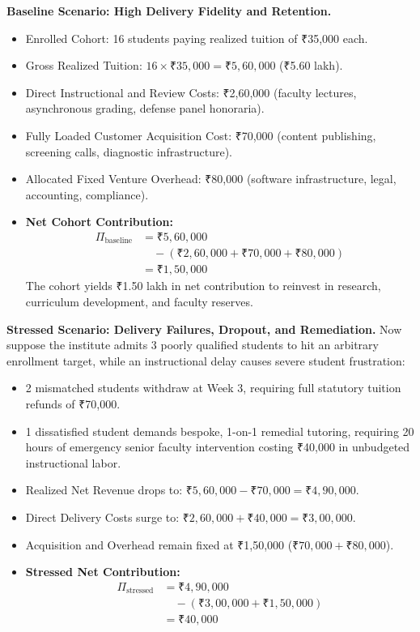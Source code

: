 \textbf{Baseline Scenario: High Delivery Fidelity and Retention.}
\begin{itemize}[leftmargin=*]
\item Enrolled Cohort: 16 students paying realized tuition of ₹35,000 each.
\item Gross Realized Tuition: $16 \times \text{₹}35,000 = \text{₹}5,60,000$ (₹5.60 lakh).
\item Direct Instructional and Review Costs: ₹2,60,000 (faculty lectures, asynchronous grading, defense panel honoraria).
\item Fully Loaded Customer Acquisition Cost: ₹70,000 (content publishing, screening calls, diagnostic infrastructure).
\item Allocated Fixed Venture Overhead: ₹80,000 (software infrastructure, legal, accounting, compliance).
\item \textbf{Net Cohort Contribution:} 
\begin{equation}
\begin{aligned}
\Pi_{\text{baseline}} &= \text{₹}5,60,000 \\
&\quad - (\text{₹}2,60,000 + \text{₹}70,000 + \text{₹}80,000) \\
&= \text{₹}1,50,000
\end{aligned}
\end{equation}
The cohort yields ₹1.50 lakh in net contribution to reinvest in research, curriculum development, and faculty reserves.
\end{itemize}

\textbf{Stressed Scenario: Delivery Failures, Dropout, and Remediation.}
Now suppose the institute admits 3 poorly qualified students to hit an arbitrary enrollment target, while an instructional delay causes severe student frustration:
\begin{itemize}[leftmargin=*]
\item 2 mismatched students withdraw at Week 3, requiring full statutory tuition refunds of ₹70,000.
\item 1 dissatisfied student demands bespoke, 1-on-1 remedial tutoring, requiring 20 hours of emergency senior faculty intervention costing ₹40,000 in unbudgeted instructional labor.
\item Realized Net Revenue drops to: $\text{₹}5,60,000 - \text{₹}70,000 = \text{₹}4,90,000$.
\item Direct Delivery Costs surge to: $\text{₹}2,60,000 + \text{₹}40,000 = \text{₹}3,00,000$.
\item Acquisition and Overhead remain fixed at ₹1,50,000 ($\text{₹}70,000 + \text{₹}80,000$).
\item \textbf{Stressed Net Contribution:}
\begin{equation}
\begin{aligned}
\Pi_{\text{stressed}} &= \text{₹}4,90,000 \\
&\quad - (\text{₹}3,00,000 + \text{₹}1,50,000) \\
&= \text{₹}40,000
\end{aligned}
\end{equation}
\end{itemize}

